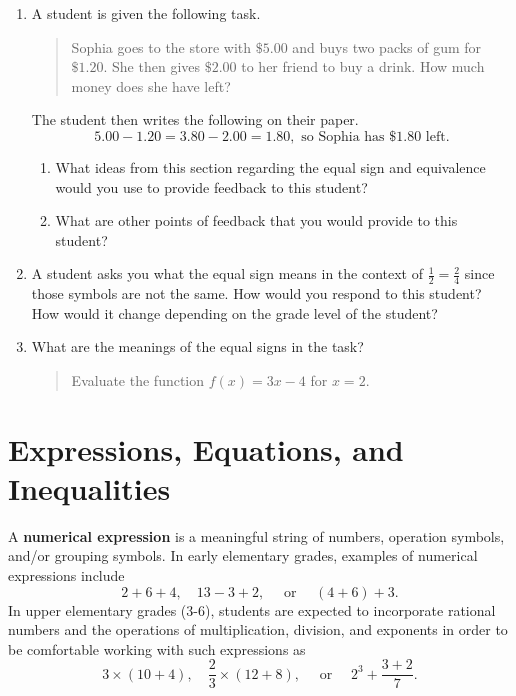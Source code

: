 \documentclass[
]{book}
\theoremstyle{definition}
\theoremstyle{definition}
\theoremstyle{definition}
\theoremstyle{definition}
\theoremstyle{remark}
\begin{document}
\begin{enumerate}
\def\labelenumi{\arabic{enumi}.}
\item
  A student is given the following task.

  \begin{quote}
  Sophia goes to the store with \(\$5.00\) and buys two packs of gum for \(\$1.20\). She then gives \(\$2.00\) to her friend to buy a drink. How much money does she have left?
  \end{quote}

  The student then writes the following on their paper.
  \[5.00-1.20=3.80-2.00=1.80, \mbox{ so Sophia has } \$1.80 \mbox{ left.}\]

  \begin{enumerate}
  \def\labelenumii{\alph{enumii}.}
  \item
    What ideas from this section regarding the equal sign and equivalence would you use to provide feedback to this student?
  \item
    What are other points of feedback that you would provide to this student?
  \end{enumerate}
\item
  A student asks you what the equal sign means in the context of \(\frac{1}{2}=\frac{2}{4}\) since those symbols are not the same. How would you respond to this student? How would it change depending on the grade level of the student?
\item
  What are the meanings of the equal signs in the task?

  \begin{quote}
  Evaluate the function \(f(x)=3x-4\) for \(x=2\).
  \end{quote}
\end{enumerate}

\hypertarget{expressions-equations-and-inequalities}{%
\section{Expressions, Equations, and Inequalities}\label{expressions-equations-and-inequalities}}

A \textbf{numerical expression} is a meaningful string of numbers, operation symbols, and/or grouping symbols. In early elementary grades, examples of numerical expressions include \[2+6+4, \quad 13-3+2, \quad \mbox{ or } \quad (4+6)+3.\] In upper elementary grades (3-6), students are expected to incorporate rational numbers and the operations of multiplication, division, and exponents in order to be comfortable working with such expressions as
\[3 \times (10+4), \quad \frac{2}{3} \times (12+8), \quad \mbox{ or } \quad  2^3 + \frac{3+2}{7}.\]
\end{document}
